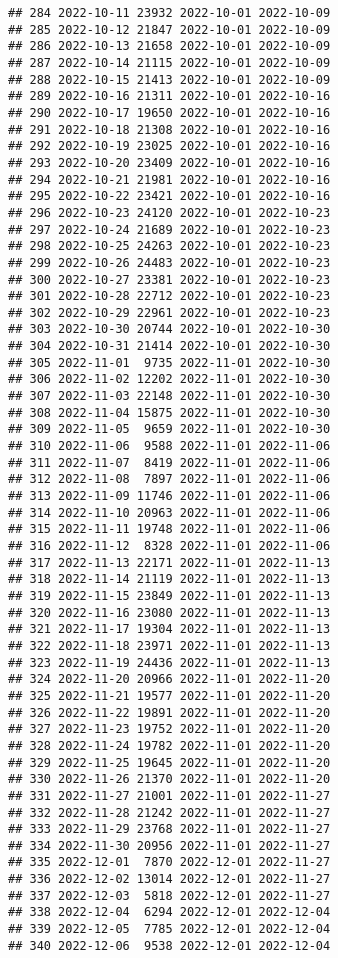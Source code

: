 \documentclass[
]{article}
\begin{document}
\begin{verbatim}
## 284 2022-10-11 23932 2022-10-01 2022-10-09
## 285 2022-10-12 21847 2022-10-01 2022-10-09
## 286 2022-10-13 21658 2022-10-01 2022-10-09
## 287 2022-10-14 21115 2022-10-01 2022-10-09
## 288 2022-10-15 21413 2022-10-01 2022-10-09
## 289 2022-10-16 21311 2022-10-01 2022-10-16
## 290 2022-10-17 19650 2022-10-01 2022-10-16
## 291 2022-10-18 21308 2022-10-01 2022-10-16
## 292 2022-10-19 23025 2022-10-01 2022-10-16
## 293 2022-10-20 23409 2022-10-01 2022-10-16
## 294 2022-10-21 21981 2022-10-01 2022-10-16
## 295 2022-10-22 23421 2022-10-01 2022-10-16
## 296 2022-10-23 24120 2022-10-01 2022-10-23
## 297 2022-10-24 21689 2022-10-01 2022-10-23
## 298 2022-10-25 24263 2022-10-01 2022-10-23
## 299 2022-10-26 24483 2022-10-01 2022-10-23
## 300 2022-10-27 23381 2022-10-01 2022-10-23
## 301 2022-10-28 22712 2022-10-01 2022-10-23
## 302 2022-10-29 22961 2022-10-01 2022-10-23
## 303 2022-10-30 20744 2022-10-01 2022-10-30
## 304 2022-10-31 21414 2022-10-01 2022-10-30
## 305 2022-11-01  9735 2022-11-01 2022-10-30
## 306 2022-11-02 12202 2022-11-01 2022-10-30
## 307 2022-11-03 22148 2022-11-01 2022-10-30
## 308 2022-11-04 15875 2022-11-01 2022-10-30
## 309 2022-11-05  9659 2022-11-01 2022-10-30
## 310 2022-11-06  9588 2022-11-01 2022-11-06
## 311 2022-11-07  8419 2022-11-01 2022-11-06
## 312 2022-11-08  7897 2022-11-01 2022-11-06
## 313 2022-11-09 11746 2022-11-01 2022-11-06
## 314 2022-11-10 20963 2022-11-01 2022-11-06
## 315 2022-11-11 19748 2022-11-01 2022-11-06
## 316 2022-11-12  8328 2022-11-01 2022-11-06
## 317 2022-11-13 22171 2022-11-01 2022-11-13
## 318 2022-11-14 21119 2022-11-01 2022-11-13
## 319 2022-11-15 23849 2022-11-01 2022-11-13
## 320 2022-11-16 23080 2022-11-01 2022-11-13
## 321 2022-11-17 19304 2022-11-01 2022-11-13
## 322 2022-11-18 23971 2022-11-01 2022-11-13
## 323 2022-11-19 24436 2022-11-01 2022-11-13
## 324 2022-11-20 20966 2022-11-01 2022-11-20
## 325 2022-11-21 19577 2022-11-01 2022-11-20
## 326 2022-11-22 19891 2022-11-01 2022-11-20
## 327 2022-11-23 19752 2022-11-01 2022-11-20
## 328 2022-11-24 19782 2022-11-01 2022-11-20
## 329 2022-11-25 19645 2022-11-01 2022-11-20
## 330 2022-11-26 21370 2022-11-01 2022-11-20
## 331 2022-11-27 21001 2022-11-01 2022-11-27
## 332 2022-11-28 21242 2022-11-01 2022-11-27
## 333 2022-11-29 23768 2022-11-01 2022-11-27
## 334 2022-11-30 20956 2022-11-01 2022-11-27
## 335 2022-12-01  7870 2022-12-01 2022-11-27
## 336 2022-12-02 13014 2022-12-01 2022-11-27
## 337 2022-12-03  5818 2022-12-01 2022-11-27
## 338 2022-12-04  6294 2022-12-01 2022-12-04
## 339 2022-12-05  7785 2022-12-01 2022-12-04
## 340 2022-12-06  9538 2022-12-01 2022-12-04

\end{verbatim}
\end{document}
